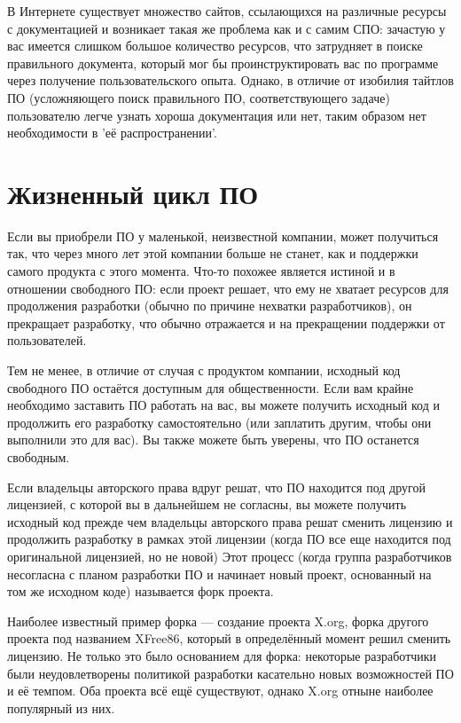 \documentclass[10pt]{book}
\begin{document}
В Интернете существует множество сайтов, ссылающихся на различные ресурсы с документацией и возникает такая же проблема как и с самим СПО: зачастую у вас имеется слишком большое количество ресурсов, что затрудняет в поиске правильного документа, который мог бы проинструктировать вас по программе через получение пользовательского опыта. Однако, в отличие от изобилия тайтлов ПО (усложняющего поиск правильного ПО, соответствующего задаче) пользователю легче узнать хороша документация или нет, таким образом нет необходимости в 'её распространении'.

\section{Жизненный цикл ПО}

Если вы приобрели ПО у маленькой, неизвестной компании, может получиться так, что через много лет этой компании больше не станет, как и поддержки самого продукта с этого момента. Что-то похожее является истиной и в отношении   свободного ПО: если проект решает, что ему не хватает ресурсов для продолжения разработки (обычно по причине нехватки разработчиков), он прекращает разработку, что обычно отражается и на прекращении поддержки от пользователей.

Тем не менее, в отличие от случая с продуктом компании, исходный код свободного ПО остаётся доступным для общественности. Если вам крайне необходимо заставить ПО работать на вас, вы можете получить исходный код и продолжить его разработку самостоятельно (или заплатить другим, чтобы они выполнили это для вас). Вы также можете быть уверены, что ПО останется свободным. 

Если владельцы авторского права вдруг решат, что ПО находится под другой лицензией, с которой вы в дальнейшем не согласны, вы можете получить исходный код прежде чем владельцы авторского права решат сменить лицензию и продолжить разработку в рамках этой лицензии (когда ПО все еще находится под оригинальной лицензией, но не новой) Этот процесс (когда группа разработчиков несогласна с планом разработки ПО и начинает новый проект, основанный на том же исходном коде) называется форк проекта.

Наиболее известный пример форка — создание проекта X.org, форка другого проекта под названием XFree86, который в определённый момент решил сменить лицензию. Не только это было основанием для форка: некоторые разработчики были неудовлетворены политикой разработки касательно новых возможностей ПО и её темпом. Оба проекта всё ещё существуют, однако X.org отныне наиболее популярный из них.
\end{document}
